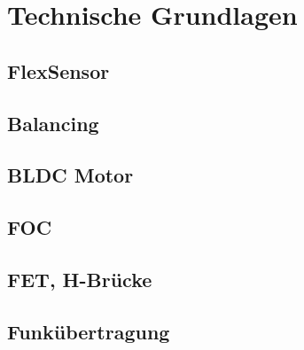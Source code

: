 \chapter{Technische Grundlagen}
\section{FlexSensor}
\section{Balancing}
\section{BLDC Motor}
\section{FOC}
\section{FET, H-Brücke}
\section{Funkübertragung}
